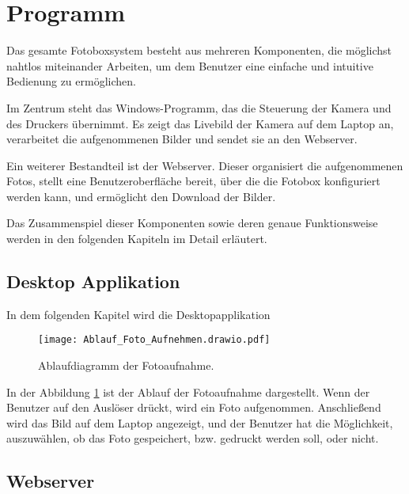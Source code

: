 \graphicspath{{images/program}}

\section{Programm}


Das gesamte Fotoboxsystem besteht aus mehreren Komponenten, die möglichst nahtlos
miteinander Arbeiten, um dem Benutzer eine einfache und intuitive Bedienung
zu ermöglichen. 

Im Zentrum steht das Windows-Programm, das die Steuerung der Kamera und des
Druckers übernimmt. Es zeigt das Livebild der Kamera auf dem Laptop an,
verarbeitet die aufgenommenen Bilder und sendet sie an den Webserver.

Ein weiterer Bestandteil ist der Webserver. Dieser organisiert die
aufgenommenen Fotos, stellt eine Benutzeroberfläche bereit, über die die Fotobox
konfiguriert werden kann, und ermöglicht den Download der Bilder.

Das Zusammenspiel dieser Komponenten sowie deren genaue Funktionsweise werden
in den folgenden Kapiteln im Detail erläutert.

\newpage

\subsection{Desktop Applikation}

In dem folgenden Kapitel wird die Desktopapplikation 

\begin{figure}[H]
    \centering
    \texttt{[image: Ablauf\_Foto\_Aufnehmen.drawio.pdf]}
    \caption{Ablaufdiagramm der Fotoaufnahme.}
    \label{fig:Ablauf_Foto_Aufnehmen}
\end{figure}

In der Abbildung \ref{fig:Ablauf_Foto_Aufnehmen} ist der Ablauf der Fotoaufnahme dargestellt.
Wenn der Benutzer auf den Auslöser drückt, wird ein Foto aufgenommen.
Anschließend wird das Bild auf dem Laptop angezeigt, und der Benutzer hat die Möglichkeit,
auszuwählen, ob das Foto gespeichert, bzw. gedruckt werden soll, oder nicht.

\subsection{Webserver}

